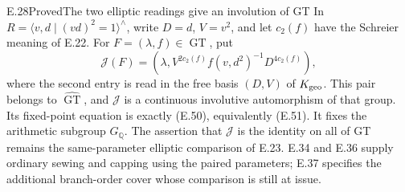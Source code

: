 \begin{result}{E.28}{Proved}{The two elliptic readings give an involution of GT}
In $R=\langle v,d\mid(vd)^2=1\rangle^{\wedge}$,
write $D=d$, $V=v^2$, and let $c_2(f)$ have the
Schreier meaning of E.22.  For
$F=(\lambda,f)\in\widehat{\operatorname{GT}}$, put
\[
 \mathcal J(F)=\left(\lambda,
       V^{2c_2(f)}f(v,d^2)^{-1}D^{4c_2(f)}\right),        \tag{E.72}
\]
where the second entry is read in the free basis
$(D,V)$ of $K_{\rm geo}$.
This pair belongs to $\widehat{\operatorname{GT}}$,
and $\mathcal J$ is a continuous involutive
automorphism of that group.  Its fixed-point
equation is exactly (E.50), equivalently (E.51).
It fixes the arithmetic subgroup $G_{\mathbb Q}$.
The assertion that $\mathcal J$ is the identity
on all of GT remains the same-parameter elliptic
comparison of E.23.  E.34 and E.36 supply ordinary
sewing and capping using the paired parameters;
E.37 specifies the additional branch-order
cover whose comparison is still at issue.
\end{result}

